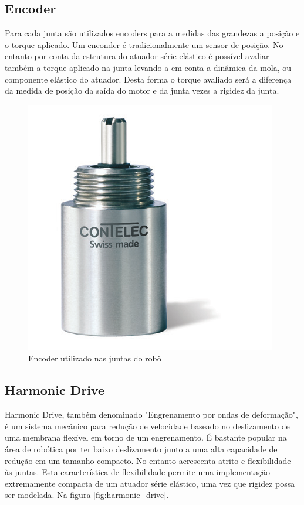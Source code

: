 
\subsection{Encoder}


Para cada junta são utilizados encoders para a medidas das grandezas a posição e o torque aplicado. Um enconder é tradicionalmente um sensor de posição. No entanto por conta da estrutura do atuador série elástico é possível avaliar também a torque aplicado na junta levando a em conta a dinâmica da mola, ou componente elástico do atuador. Desta forma o torque avaliado será a diferença da medida de posição da saída do motor e da junta vezes a rigidez da junta. 

\begin{figure}[H]
    \centering
    \includegraphics[width = 0.4\linewidth]{figs/vertX-encoder}
        \caption{Encoder utilizado nas juntas do robô}
    \label{fig:encoder}
\end{figure}

\subsection{Harmonic Drive}

Harmonic Drive, também denominado "Engrenamento por ondas de deformação", é um sistema mecânico para redução de velocidade baseado no deslizamento de uma membrana flexível em torno de um engrenamento. É bastante popular na área de robótica por ter baixo deslizamento junto a uma alta capacidade de redução em um tamanho compacto. No entanto acrescenta atrito e flexibilidade às juntas. Esta característica de flexibilidade permite uma implementação extremamente compacta de um atuador série elástico, uma vez que rigidez possa ser modelada. Na figura \ref{fig:harmonic_drive}.

